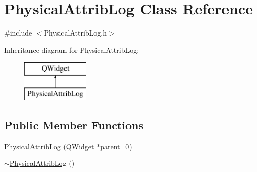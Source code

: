 \hypertarget{class_physical_attrib_log}{\section{Physical\-Attrib\-Log Class Reference}
\label{class_physical_attrib_log}
}


{\ttfamily \#include $<$Physical\-Attrib\-Log.\-h$>$}

Inheritance diagram for Physical\-Attrib\-Log\-:\begin{figure}[H]
\begin{center}
\leavevmode
\includegraphics[height=2.000000cm]{class_physical_attrib_log}
\end{center}
\end{figure}
\subsection*{Public Member Functions}
\begin{DoxyCompactItemize}
\item 
\hyperlink{class_physical_attrib_log_acc5e8a8e22a5beadbe74b1a02fa85263}{Physical\-Attrib\-Log} (Q\-Widget $\ast$parent=0)
\item 
\hyperlink{class_physical_attrib_log_a6cd3e9ff03598f1cfa13f7a78ca1a78b}{$\sim$\-Physical\-Attrib\-Log} ()
\end{DoxyCompactItemize}


